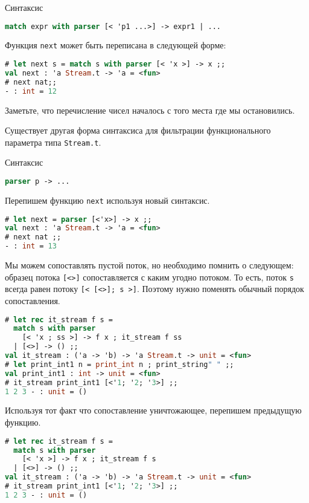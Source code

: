 Синтаксис

\begin{lstlisting}[language=OCaml]
match expr with parser [< 'p1 ...>] -> expr1 | ...
\end{lstlisting}

Функция \texttt{next} может быть переписана в следующей форме:

\begin{lstlisting}[language=OCaml]
# let next s = match s with parser [< 'x >] -> x ;;
val next : 'a Stream.t -> 'a = <fun>
# next nat;;
- : int = 12
\end{lstlisting}

Заметьте, что перечисление чисел началось с того места где мы остановились.

Существует другая форма синтаксиса для фильтрации функционального параметра типа
\texttt{Stream.t}.

Синтаксис

\begin{lstlisting}[language=OCaml]
parser p -> ...
\end{lstlisting}

Перепишем функцию \texttt{next} используя новый синтаксис. 

\begin{lstlisting}[language=OCaml]
# let next = parser [<'x>] -> x ;;
val next : 'a Stream.t -> 'a = <fun>
# next nat ;;
- : int = 13
\end{lstlisting}

Мы можем сопоставлять пустой поток, но необходимо помнить о следующем: образец
потока \texttt{[<>]} сопоставляется с каким угодно потоком. То есть, поток
\texttt{s} всегда равен потоку \texttt{[< [<>]; s >]}. Поэтому нужно поменять
обычный порядок сопоставления.

\begin{lstlisting}[language=OCaml]
# let rec it_stream f s =
  match s with parser
    [< 'x ; ss >] -> f x ; it_stream f ss
  | [<>] -> () ;;
val it_stream : ('a -> 'b) -> 'a Stream.t -> unit = <fun>
# let print_int1 n = print_int n ; print_string" " ;;
val print_int1 : int -> unit = <fun>
# it_stream print_int1 [<'1; '2; '3>] ;;
1 2 3 - : unit = ()
\end{lstlisting}

Используя тот факт что сопоставление уничтожающее, перепишем предыдущую функцию.

\begin{lstlisting}[language=OCaml]
# let rec it_stream f s =
  match s with parser
    [< 'x >] -> f x ; it_stream f s
  | [<>] -> () ;;
val it_stream : ('a -> 'b) -> 'a Stream.t -> unit = <fun>
# it_stream print_int1 [<'1; '2; '3>] ;;
1 2 3 - : unit = ()
\end{lstlisting}

